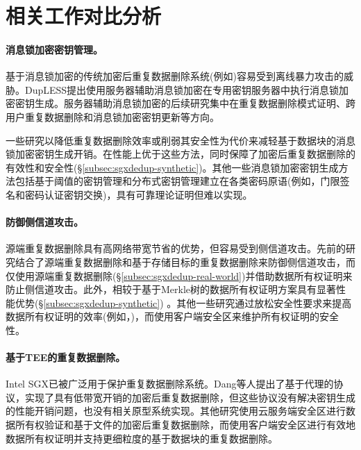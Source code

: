 \section{相关工作对比分析}
\label{sec:sgxdedup-related_work}

\paragraph*{消息锁加密密钥管理。} 基于消息锁加密的传统加密后重复数据删除系统(例如)容易受到离线暴力攻击的威胁。DupLESS提出使用服务器辅助消息锁加密在专用密钥服务器中执行消息锁加密密钥生成。服务器辅助消息锁加密的后续研究集中在重复数据删除模式证明、跨用户重复数据删除和消息锁加密密钥更新等方向。

一些研究以降低重复数据删除效率或削弱其安全性为代价来减轻基于数据块的消息锁加密密钥生成开销。\sysnameS 在性能上优于这些方法，同时保障了加密后重复数据删除的有效性和安全性(\S\ref{subsec:sgxdedup-synthetic})。其他一些消息锁加密密钥生成方法包括基于阈值的密钥管理和分布式密钥管理建立在各类密码原语(例如，门限签名和密码认证密钥交换)，具有可靠理论证明但难以实现。

\paragraph*{防御侧信道攻击。}源端重复数据删除具有高网络带宽节省的优势，但容易受到侧信道攻击。先前的研究结合了源端重复数据删除和基于存储目标的重复数据删除来防御侧信道攻击，而\sysnameS 仅使用源端重复数据删除(\S\ref{subsec:sgxdedup-real-world})并借助数据所有权证明来防止侧信道攻击。此外，\sysnameS 相较于基于Merkle树的数据所有权证明方案具有显著性能优势(\S\ref{subsec:sgxdedup-synthetic}) 。其他一些研究通过放松安全性要求来提高数据所有权证明的效率(例如，)，而\sysnameS 使用客户端安全区来维护所有权证明的安全性。

\paragraph*{基于TEE的重复数据删除。} Intel SGX已被广泛用于保护重复数据删除系统。Dang等人提出了基于代理的协议，实现了具有低带宽开销的加密后重复数据删除，但这些协议没有解决密钥生成的性能开销问题，也没有相关原型系统实现。其他研究使用云服务端安全区进行数据所有权验证和基于文件的加密后重复数据删除，而\sysnameS 使用客户端安全区进行有效地数据所有权证明并支持更细粒度的基于数据块的重复数据删除。
